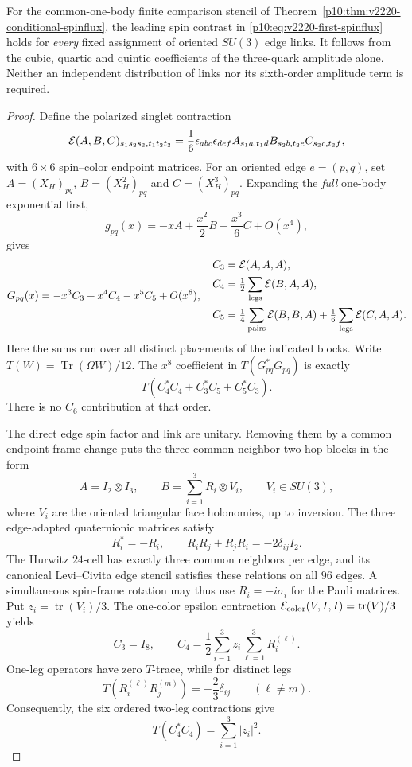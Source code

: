 \documentclass[12pt,a4paper]{article}
\begin{document}
\begin{theorem}
\label{p10:thm:v230-all-link-spinflux}
For the common-one-body finite comparison stencil of
Theorem~\ref{p10:thm:v2220-conditional-spinflux}, the leading
spin contrast in \eqref{p10:eq:v2220-first-spinflux} holds for
\emph{every} fixed assignment of oriented $SU(3)$ edge links.
It follows from the cubic, quartic and quintic coefficients of the
three-quark amplitude alone.  Neither an independent distribution of links
nor its sixth-order amplitude term is required.
\end{theorem}
\begin{proof}
Define the polarized singlet contraction
\[
 {\cal E}(A,B,C)_{s_1s_2s_3,t_1t_2t_3}
  =\frac16\epsilon_{abc}\epsilon_{def}
       A_{s_1a,t_1d}B_{s_2b,t_2e}C_{s_3c,t_3f},
\]
with $6\times6$ spin--color endpoint matrices.  For an oriented edge
$e=(p,q)$, set $A=(X_H)_{pq}$, $B=(X_H^2)_{pq}$ and
$C=(X_H^3)_{pq}$.  Expanding the \emph{full} one-body exponential first,
\[
 g_{pq}(x)=-xA+\frac{x^2}{2}B-\frac{x^3}{6}C+O(x^4),
\]
gives
\[
 G_{pq}(x)=-x^3C_3+x^4C_4-x^5C_5+O(x^6),
\quad
\begin{aligned}
 C_3&={\cal E}(A,A,A),\\
 C_4&=\tfrac12\sum_{\rm legs}{\cal E}(B,A,A),\\
 C_5&=\tfrac14\sum_{\rm pairs}{\cal E}(B,B,A)
       +\tfrac16\sum_{\rm legs}{\cal E}(C,A,A).
\end{aligned}
\]
Here the sums run over all distinct placements of the indicated blocks.
Write $T(W)=\operatorname{Tr}(\Omega W)/12$.  The $x^8$
coefficient in $T(G_{pq}^*G_{pq})$ is exactly
\begin{equation}\label{p10:eq:v230-order-eight-input}
 T(C_4^*C_4+C_3^*C_5+C_5^*C_3).
\end{equation}
There is no $C_6$ contribution at that order.

The direct edge spin factor and link are unitary.  Removing them by a
common endpoint-frame change puts the three common-neighbor two-hop
blocks in the form
\[
 A=I_2\otimes I_3,\qquad
 B=\sum_{i=1}^3R_i\otimes V_i,\qquad V_i\in SU(3),
\]
where $V_i$ are the oriented triangular face holonomies, up to inversion.
The three edge-adapted quaternionic matrices satisfy
\[
 R_i^*=-R_i,\qquad
 R_iR_j+R_jR_i=-2\delta_{ij}I_2.
\]
The Hurwitz $24$-cell has exactly three common neighbors per edge, and
its canonical Levi--Civita edge stencil satisfies these relations on
all $96$ edges.  A simultaneous spin-frame rotation may thus use
$R_i=-i\sigma_i$ for the Pauli matrices.  Put
$z_i=\operatorname{tr}(V_i)/3$.
The one-color epsilon contraction
${\cal E}_{\rm color}(V,I,I)=\operatorname{tr}(V)/3$
yields
\[
 C_3=I_8,\qquad
 C_4=\frac12\sum_{i=1}^3z_i\sum_{\ell=1}^3R_i^{(\ell)}.
\]
One-leg operators have zero $T$-trace, while for distinct legs
\[
 T(R_i^{(\ell)}R_j^{(m)})=-\frac23\delta_{ij}
 \qquad(\ell\ne m).
\]
Consequently, the six ordered two-leg contractions give
\begin{equation}\label{p10:eq:v230-flux-square}
 T(C_4^*C_4)=\sum_{i=1}^3|z_i|^2.
\end{equation}


\end{proof}
\end{document}

